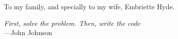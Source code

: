 %
\begin{frontmatter}

%
%
\makefrontmatter

%
%
%
%
%
%
\begin{dedication}
	To my family, and specially to my wife, Embriette Hyde.
\end{dedication}

%
%



%
%

\begin{epigraph}
  \emph{First, solve the problem. Then, write the code}\\
  ---John Johnson
\end{epigraph}

%
\tableofcontents

\renewcommand{\glossarysection}[2][]{
\newpage
\noindent
\centerline{LIST OF ABBREVIATIONS}
}


\end{frontmatter}
